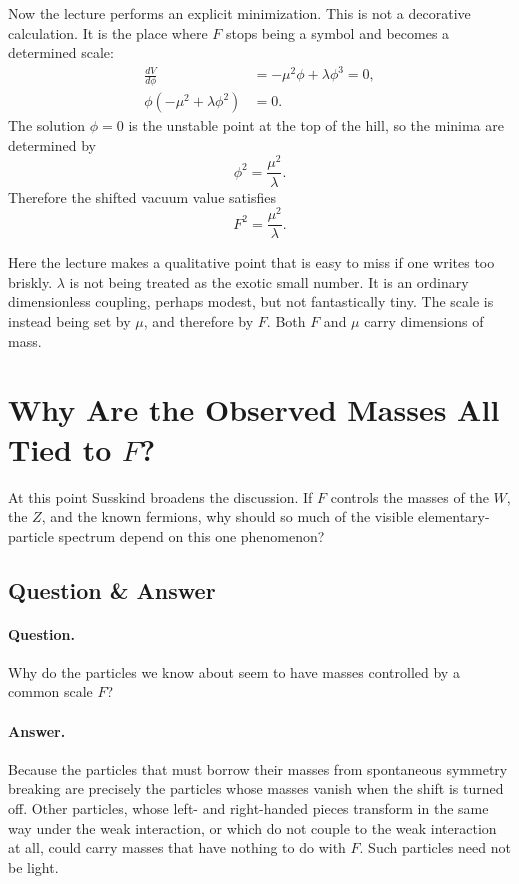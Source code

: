 Now the lecture performs an explicit minimization. This is not a decorative calculation. It is the place where \(F\) stops being a symbol and becomes a determined scale:
\begin{align}
\frac{dV}{d\phi}
&=
-\mu^2\phi+\lambda\phi^3 = 0, \\
\phi\left(-\mu^2+\lambda\phi^2\right) &= 0.
\end{align}
The solution \(\phi=0\) is the unstable point at the top of the hill, so the minima are determined by
\begin{equation}
\phi^2=\frac{\mu^2}{\lambda}.
\end{equation}
Therefore the shifted vacuum value satisfies
\begin{equation}
F^2=\frac{\mu^2}{\lambda}.
\end{equation}

Here the lecture makes a qualitative point that is easy to miss if one writes too briskly. \(\lambda\) is not being treated as the exotic small number. It is an ordinary dimensionless coupling, perhaps modest, but not fantastically tiny. The scale is instead being set by \(\mu\), and therefore by \(F\). Both \(F\) and \(\mu\) carry dimensions of mass.

\section{Why Are the Observed Masses All Tied to \(F\)?}

At this point Susskind broadens the discussion. If \(F\) controls the masses of the \(W\), the \(Z\), and the known fermions, why should so much of the visible elementary-particle spectrum depend on this one phenomenon?

\subsection{Question \& Answer}

\paragraph{Question.} Why do the particles we know about seem to have masses controlled by a common scale \(F\)?

\paragraph{Answer.} Because the particles that must borrow their masses from spontaneous symmetry breaking are precisely the particles whose masses vanish when the shift is turned off. Other particles, whose left- and right-handed pieces transform in the same way under the weak interaction, or which do not couple to the weak interaction at all, could carry masses that have nothing to do with \(F\). Such particles need not be light.

